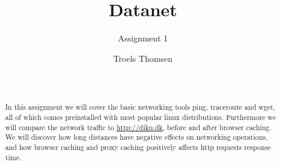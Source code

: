 \documentclass{acm_proc_article-sp}
\begin{document}
\title{Datanet}
\subtitle{Assignment 1}

%
%
%
%


\author{
%
%
\alignauthor
Troels Thomsen\\
       \\
       \\
}

\maketitle

\begin{abstract}
In this assignment we will cover the basic networking tools ping, traceroute and wget, all of which comes preinstalled with most popular linux distributions. Furthermore we will compare the network traffic to \url{http://diku.dk}, before and after browser caching.\\
We will discover how long distances have negative effects on networking operations, and how browser caching and proxy caching positively affects http requests response time. 
\end{abstract}
\end{document}
